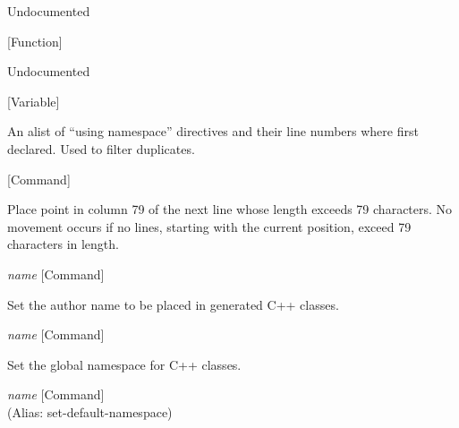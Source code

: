 \begin{doc-string}
Undocumented
\end{doc-string}

\vspace{1em}
\noindent
{}
\usebox{\funcname}
 \hfill [Function]

\begin{doc-string}
Undocumented
\end{doc-string}

\vspace{1em}
\noindent
{}
\usebox{\funcname}
 \hfill [Variable]

\begin{doc-string}
An alist of ``using namespace'' directives and their line numbers where first declared.
Used to filter duplicates.
\end{doc-string}

\vspace{1em}
\noindent
{}
\usebox{\funcname}
 \hfill [Command]

\begin{doc-string}
Place point in column 79 of the next line whose length exceeds 79 characters.
No movement occurs if no lines, starting with the current position, exceed 79
characters in length.
\end{doc-string}

\vspace{1em}
\noindent
{}
\usebox{\funcname}\emph{name}
 \hfill [Command]

\begin{doc-string}
Set the author name to be placed in generated C++ classes.
\end{doc-string}

\vspace{1em}
\noindent
{}
\usebox{\funcname}\emph{name}
 \hfill [Command]

\begin{doc-string}
Set the global namespace for C++ classes.
\end{doc-string}

\vspace{1em}
\noindent
{}
\usebox{\funcname}\emph{name}
 \hfill [Command]\\%
 (Alias: set-default-namespace)

